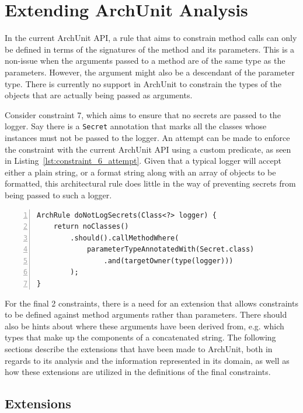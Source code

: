 \section{Extending ArchUnit Analysis}

In the current ArchUnit API, a rule that aims to constrain method calls can only be defined in terms of the signatures of the method and its parameters. This is a non-issue when the arguments passed to a method are of the same type as the parameters. However, the argument might also be a descendant of the parameter type. There is currently no support in ArchUnit to constrain the types of the objects that are actually being passed as arguments.

Consider constraint 7, which aims to ensure that no secrets are passed to the logger. Say there is a \texttt{Secret} annotation that marks all the classes whose instances must not be passed to the logger. An attempt can be made to enforce the constraint with the current ArchUnit API using a custom predicate, as seen in Listing~\ref{lst:constraint_6_attempt}. Given that a typical logger will accept either a plain string, or a format string along with an array of objects to be formatted, this architectural rule does little in the way of preventing secrets from being passed to such a logger.

\begin{minipage}{\linewidth}
\begin{lstlisting}[caption={A first attempt to implement constraint 7.}, captionpos=b, label=lst:constraint_6_attempt, numbers=left]
ArchRule doNotLogSecrets(Class<?> logger) {
    return noClasses()
        .should().callMethodWhere(
            parameterTypeAnnotatedWith(Secret.class)
                .and(targetOwner(type(logger)))
        );
}
\end{lstlisting}
\end{minipage}

For the final 2 constraints, there is a need for an extension that allows constraints to be defined against method arguments rather than parameters. There should also be hints about where these arguments have been derived from, e.g. which types that make up the components of a concatenated string. The following sections describe the extensions that have been made to ArchUnit, both in regards to its analysis and the information represented in its domain, as well as how these extensions are utilized in the definitions of the final constraints.

\subsection{Extensions}

